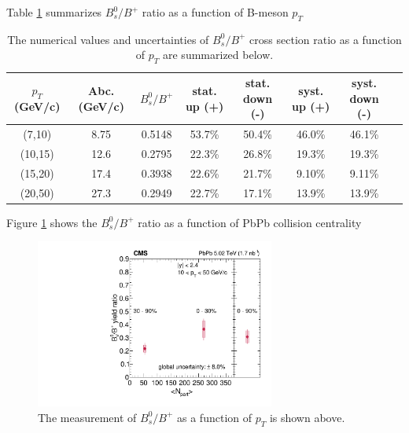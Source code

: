 Table \ref{BsBPPtCMS} summarizes $B^0_s/B^+$ ratio as a function of B-meson $p_T$


\begin{table}[h]
\begin{center}
\caption{The numerical values and uncertainties of $B^0_s/B^+$ cross section ratio as a function of $p_T$ are summarized below.}
\vspace{1em}
\label{BsBPPtCMS}
  \begin{tabular}{| c | c |c | c| c| c| c| c|}
    \hline
  $p_T$ (GeV/c) & Abc. (GeV/c) & $B^0_s/B^+$ & stat. up (+) & stat. down (-)  & syst. up (+) & syst. down (-) \\
    \hline
    \hline
    (7,10) &  8.75&  0.5148 & 53.7\% & 50.4\%  &  46.0\% &  46.1\% \\
    (10,15) &12.6  &  0.2795 & 22.3\% & 26.8\%  & 19.3\% & 19.3\%  \\
    (15,20) &17.4  & 0.3938 & 22.6\% & 21.7\% & 9.10\% & 9.11\% \\
    (20,50) &27.3 & 0.2949 & 22.7\% & 17.1\% & 13.9\% & 13.9\%  \\
    \hline
    \hline
\end{tabular}
\end{center}
\end{table}


\clearpage

Figure \ref{BsBPCentDataONLY} shows the $B^0_s/B^+$ ratio as a function of PbPb collision centrality 


\begin{figure}[hbtp]
\begin{center}
\includegraphics[width=0.70\textwidth]{Figures/Chapter5/ratio_vsCent_ref0.pdf}
\caption{The measurement of $B^0_s/B^+$ as a function of $p_T$ is shown above.}
\label{BsBPCentDataONLY}
\end{center}
\end{figure}


